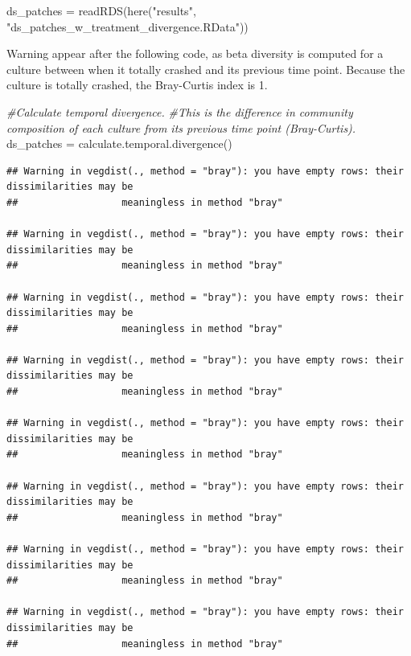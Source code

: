 \documentclass[
]{article}
\newenvironment{Shaded}{\begin{snugshade}}{\end{snugshade}}
\newcommand{\CommentTok}[1]{\textcolor[rgb]{0.56,0.35,0.01}{\textit{#1}}}
\newcommand{\FunctionTok}[1]{\textcolor[rgb]{0.00,0.00,0.00}{#1}}
\newcommand{\NormalTok}[1]{#1}
\newcommand{\OtherTok}[1]{\textcolor[rgb]{0.56,0.35,0.01}{#1}}
\newcommand{\StringTok}[1]{\textcolor[rgb]{0.31,0.60,0.02}{#1}}
\begin{document}
\begin{Shaded}
\begin{Highlighting}[]
\NormalTok{ds\_patches }\OtherTok{=} \FunctionTok{readRDS}\NormalTok{(}\FunctionTok{here}\NormalTok{(}\StringTok{"results"}\NormalTok{, }\StringTok{"ds\_patches\_w\_treatment\_divergence.RData"}\NormalTok{))}
\end{Highlighting}
\end{Shaded}

Warning appear after the following code, as beta diversity is computed
for a culture between when it totally crashed and its previous time
point. Because the culture is totally crashed, the Bray-Curtis index is
1.

\begin{Shaded}
\begin{Highlighting}[]
\CommentTok{\#Calculate temporal divergence. }
\CommentTok{\#This is the difference in community composition of each culture from its previous time point (Bray{-}Curtis).}
\NormalTok{ds\_patches }\OtherTok{=} \FunctionTok{calculate.temporal.divergence}\NormalTok{()}
\end{Highlighting}
\end{Shaded}

\begin{verbatim}
## Warning in vegdist(., method = "bray"): you have empty rows: their dissimilarities may be
##                  meaningless in method "bray"

## Warning in vegdist(., method = "bray"): you have empty rows: their dissimilarities may be
##                  meaningless in method "bray"

## Warning in vegdist(., method = "bray"): you have empty rows: their dissimilarities may be
##                  meaningless in method "bray"

## Warning in vegdist(., method = "bray"): you have empty rows: their dissimilarities may be
##                  meaningless in method "bray"

## Warning in vegdist(., method = "bray"): you have empty rows: their dissimilarities may be
##                  meaningless in method "bray"

## Warning in vegdist(., method = "bray"): you have empty rows: their dissimilarities may be
##                  meaningless in method "bray"

## Warning in vegdist(., method = "bray"): you have empty rows: their dissimilarities may be
##                  meaningless in method "bray"

## Warning in vegdist(., method = "bray"): you have empty rows: their dissimilarities may be
##                  meaningless in method "bray"
\end{verbatim}
\end{document}
